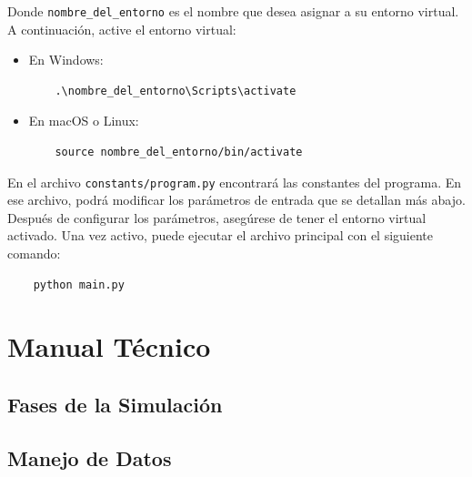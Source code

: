 \documentclass{article}
\begin{document}
Donde \texttt{nombre\_del\_entorno} es el nombre que desea asignar a su entorno virtual.
A continuación, active el entorno virtual:

\begin{itemize}
  \item En Windows:
        \begin{verbatim}
    .\nombre_del_entorno\Scripts\activate
  \end{verbatim}
  \item En macOS o Linux:
        \begin{verbatim}
    source nombre_del_entorno/bin/activate
  \end{verbatim}
\end{itemize}

En el archivo \texttt{constants/program.py} encontrará las constantes del programa.
En ese archivo, podrá modificar los parámetros de entrada que se detallan más abajo.\\

Después de configurar los parámetros, asegúrese de tener el entorno virtual activado.
Una vez activo, puede ejecutar el archivo principal con el siguiente comando:

\begin{center}
  \begin{adjustbox}{minipage=\linewidth, center}
    \begin{verbatim}
    python main.py
  \end{verbatim}
  \end{adjustbox}
\end{center}


\section{Manual Técnico}\label{sec:man_t}


\subsection{Fases de la Simulación}


\subsection{Manejo de Datos}
\end{document}
